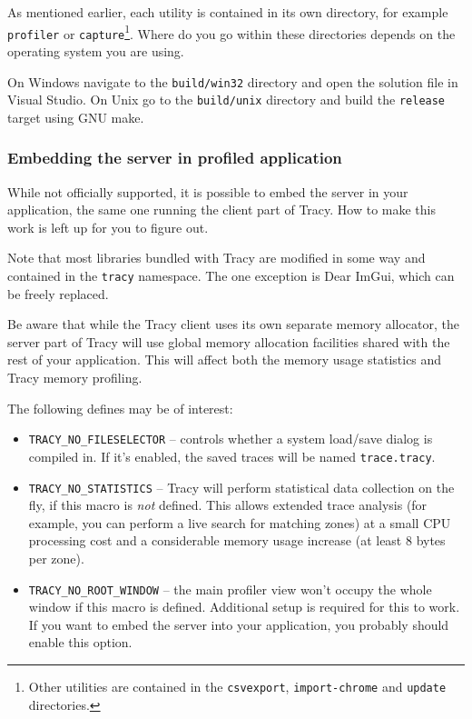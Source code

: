 \documentclass[hidelinks,titlepage,a4paper]{article}
\begin{document}
As mentioned earlier, each utility is contained in its own directory, for example \texttt{profiler} or \texttt{capture}\footnote{Other utilities are contained in the \texttt{csvexport}, \texttt{import-chrome} and \texttt{update} directories.}. Where do you go within these directories depends on the operating system you are using.

On Windows navigate to the \texttt{build/win32} directory and open the solution file in Visual Studio. On Unix go to the \texttt{build/unix} directory and build the \texttt{release} target using GNU make.

\subsubsection{Embedding the server in profiled application}
\label{embeddingserver}

While not officially supported, it is possible to embed the server in your application, the same one running the client part of Tracy. How to make this work is left up for you to figure out.

Note that most libraries bundled with Tracy are modified in some way and contained in the \texttt{tracy} namespace. The one exception is Dear ImGui, which can be freely replaced.

Be aware that while the Tracy client uses its own separate memory allocator, the server part of Tracy will use global memory allocation facilities shared with the rest of your application. This will affect both the memory usage statistics and Tracy memory profiling.

The following defines may be of interest:

\begin{itemize}
\item \texttt{TRACY\_NO\_FILESELECTOR} -- controls whether a system load/save dialog is compiled in. If it's enabled, the saved traces will be named \texttt{trace.tracy}.
\item \texttt{TRACY\_NO\_STATISTICS} -- Tracy will perform statistical data collection on the fly, if this macro is \emph{not} defined. This allows extended trace analysis (for example, you can perform a live search for matching zones) at a small CPU processing cost and a considerable memory usage increase (at least 8 bytes per zone).
\item \texttt{TRACY\_NO\_ROOT\_WINDOW} -- the main profiler view won't occupy the whole window if this macro is defined. Additional setup is required for this to work. If you want to embed the server into your application, you probably should enable this option.
\end{itemize}
\end{document}
